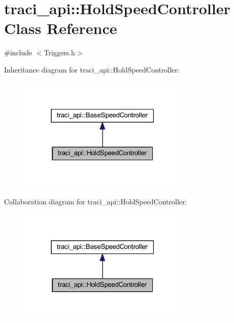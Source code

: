 \hypertarget{classtraci__api_1_1_hold_speed_controller}{}\section{traci\+\_\+api\+:\+:Hold\+Speed\+Controller Class Reference}
\label{classtraci__api_1_1_hold_speed_controller}


{\ttfamily \#include $<$Triggers.\+h$>$}



Inheritance diagram for traci\+\_\+api\+:\+:Hold\+Speed\+Controller\+:\nopagebreak
\begin{figure}[H]
\begin{center}
\leavevmode
\includegraphics[width=231pt]{classtraci__api_1_1_hold_speed_controller__inherit__graph}
\end{center}
\end{figure}


Collaboration diagram for traci\+\_\+api\+:\+:Hold\+Speed\+Controller\+:\nopagebreak
\begin{figure}[H]
\begin{center}
\leavevmode
\includegraphics[width=231pt]{classtraci__api_1_1_hold_speed_controller__coll__graph}
\end{center}
\end{figure}
